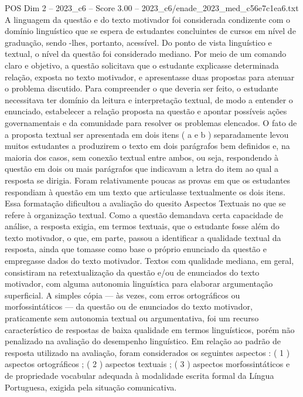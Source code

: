 \begin{textsample}{POS Dim 2 – 2023\_c6 – Score 3.00 – 2023\_c6/enade\_2023\_med\_c56e7c1ea6.txt}
A linguagem da questão e do texto motivador foi considerada condizente com o domínio linguístico que se espera de estudantes concluintes de cursos em nível de graduação, sendo -lhes, portanto, acessível.
Do ponto de vista linguístico e textual, o nível da questão foi considerado mediano.
Por meio de um comando claro e objetivo, a questão solicitava que o estudante explicasse determinada relação, exposta no texto motivador, e apresentasse duas propostas para atenuar o problema discutido.
Para compreender o que deveria ser feito, o estudante necessitava ter domínio da leitura e interpretação textual, de modo a entender o enunciado, estabelecer a relação proposta na questão e apontar possíveis ações governamentais e da comunidade para resolver os problemas elencados.
O fato de a proposta textual ser apresentada em dois itens ( a e b ) separadamente levou muitos estudantes a produzirem o texto em dois parágrafos bem definidos e, na maioria dos casos, sem conexão textual entre ambos, ou seja, respondendo à questão em dois ou mais parágrafos que indicavam a letra do item ao qual a resposta se dirigia.
Foram relativamente poucas as provas em que os estudantes respondiam à questão em um texto que articulasse textualmente os dois itens.
Essa formatação dificultou a avaliação do quesito Aspectos Textuais no que se refere à organização textual.
Como a questão demandava certa capacidade de análise, a resposta exigia, em termos textuais, que o estudante fosse além do texto motivador, o que, em parte, passou a identificar a qualidade textual da resposta, ainda que tomasse como base o próprio enunciado da questão e empregasse dados do texto motivador.
Textos com qualidade mediana, em geral, consistiram na retextualização da questão e/ou de enunciados do texto motivador, com alguma autonomia linguística para elaborar argumentação superficial.
A simples cópia — às vezes, com erros ortográficos ou morfossintáticos — da questão ou de enunciados do texto motivador, praticamente sem autonomia textual ou argumentativa, foi um recurso característico de respostas de baixa qualidade em termos linguísticos, porém não penalizado na avaliação do desempenho linguístico.
Em relação ao padrão de resposta utilizado na avaliação, foram considerados os seguintes aspectos : ( 1 ) aspectos ortográficos ; ( 2 ) aspectos textuais ; ( 3 ) aspectos morfossintáticos e de propriedade vocabular adequada à modalidade escrita formal da Língua Portuguesa, exigida pela situação comunicativa.

\end{textsample}
